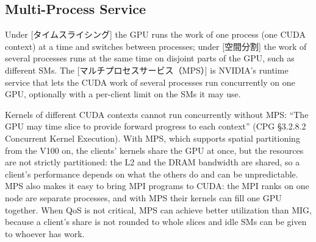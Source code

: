 \documentclass[../main.tex]{subfiles}
\begin{document}
\subsection{Multi-Process Service}

\begin{definition}
  Under [タイムスライシング] the GPU runs the work of
  one process (one CUDA context) at a time and switches between
  processes; under [空間分割] the work of
  several processes runs at the same time on disjoint parts of the GPU,
  such as different SMs.  The
  [マルチプロセスサービス（MPS）] is
  NVIDIA's runtime service that lets the CUDA work of several processes
  run concurrently on one GPU, optionally with a per-client limit on the
  SMs it may use.
\end{definition}

Kernels of different CUDA contexts cannot run concurrently without MPS:
\enquote{The GPU may time slice to provide forward progress to each
context} (CPG §3.2.8.2 Concurrent Kernel Execution).  With MPS, which
supports spatial partitioning from the V100 on, the clients' kernels
share the GPU at once, but the resources are not strictly partitioned:
the L2 and the DRAM bandwidth are shared, so a client's performance
depends on what the others do and can be unpredictable.
MPS also makes it easy to bring MPI programs to CUDA: the MPI ranks on
one node are separate processes, and with MPS their kernels can fill one
GPU together.  When QoS is not critical, MPS can achieve better
utilization than MIG, because a client's share is not rounded to whole
slices and idle SMs can be given to whoever has work.
\end{document}
